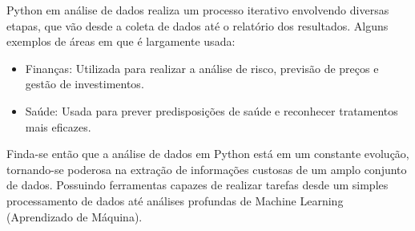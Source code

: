 Python em an\'{a}lise de dados realiza um processo iterativo envolvendo diversas etapas, que v\~{a}o desde a coleta de dados at\'{e} o relat\'{o}rio dos resultados. Alguns exemplos de \'{a}reas em que \'{e} largamente usada:

\begin{itemize} [itemsep=5pt, parsep=5pt, topsep=5pt]
  	 	
	\item Finan\c{c}as: Utilizada para realizar a an\'{a}lise de risco, previs\~{a}o de pre\c{c}os e gest\~{a}o de investimentos. 
	
	\item Sa\'{u}de: Usada para prever predisposi\c{c}\~{o}es de sa\'{u}de e reconhecer tratamentos mais eficazes.
	
\end{itemize}

Finda-se ent\~{a}o que a an\'{a}lise de dados em Python est\'{a} em um constante evolu\c{c}\~{a}o, tornando-se poderosa na extra\c{c}\~{a}o de informa\c{c}\~{o}es custosas de um amplo conjunto de dados. Possuindo ferramentas capazes de realizar tarefas desde um simples processamento de dados at\'{e} an\'{a}lises profundas de Machine Learning (Aprendizado de M\'{a}quina).